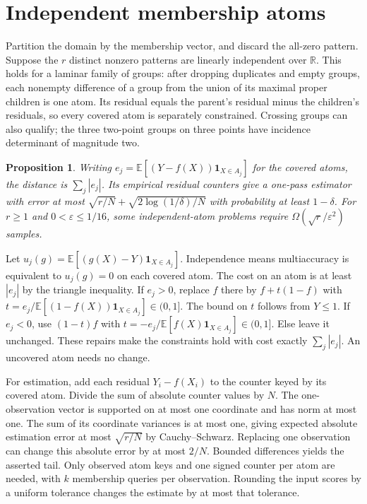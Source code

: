 \documentclass[11pt,a4paper]{amsart}
\newtheorem{proposition}[theorem]{Proposition}
\newcommand{\E}{\mathbb E}
\begin{document}
\section{Independent membership atoms}
Partition the domain by the membership vector, and discard the all-zero pattern. Suppose the $r$ distinct nonzero patterns are linearly independent over $\mathbb R$. This holds for a laminar family of groups: after dropping duplicates and empty groups, each nonempty difference of a group from the union of its maximal proper children is one atom. Its residual equals the parent's residual minus the children's residuals, so every covered atom is separately constrained. Crossing groups can also qualify; the three two-point groups on three points have incidence determinant of magnitude two.

\begin{proposition}\label{prop:atoms}
Writing $e_j=\E[(Y-f(X))\mathbf 1_{X\in A_j}]$ for the covered atoms, the distance is $\sum_j|e_j|$. Its empirical residual counters give a one-pass estimator with error at most $\sqrt{r/N}+\sqrt{2\log(1/\delta)/N}$ with probability at least $1-\delta$. For $r\geq1$ and $0<\varepsilon\leq1/16$, some independent-atom problems require $\Omega(\sqrt r/\varepsilon^2)$ samples.
\end{proposition}

Let $u_j(g)=\E[(g(X)-Y)\mathbf 1_{X\in A_j}]$. Independence means multiaccuracy is equivalent to $u_j(g)=0$ on each covered atom. The cost on an atom is at least $|e_j|$ by the triangle inequality. If $e_j>0$, replace $f$ there by $f+t(1-f)$ with $t=e_j/\E[(1-f(X))\mathbf 1_{X\in A_j}]\in(0,1]$. The bound on $t$ follows from $Y\leq1$. If $e_j<0$, use $(1-t)f$ with $t=-e_j/\E[f(X)\mathbf 1_{X\in A_j}]\in(0,1]$. Else leave it unchanged. These repairs make the constraints hold with cost exactly $\sum_j|e_j|$. An uncovered atom needs no change.

For estimation, add each residual $Y_i-f(X_i)$ to the counter keyed by its covered atom. Divide the sum of absolute counter values by $N$. The one-observation vector is supported on at most one coordinate and has norm at most one. The sum of its coordinate variances is at most one, giving expected absolute estimation error at most $\sqrt{r/N}$ by Cauchy--Schwarz. Replacing one observation can change this absolute error by at most $2/N$. Bounded differences yields the asserted tail. Only observed atom keys and one signed counter per atom are needed, with $k$ membership queries per observation. Rounding the input scores by a uniform tolerance changes the estimate by at most that tolerance.
\end{document}
